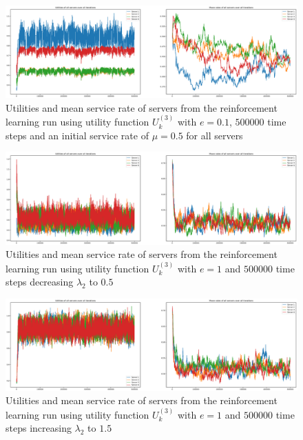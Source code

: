 \begin{figure}[H]
    \includegraphics[width=\textwidth]{chapters/00_appendix/03_more_rl_results/Bin/utility_3_eps/u3_3_initial_05.eps}
    \caption{Utilities and mean service rate of servers from the reinforcement
    learning run using utility function \(U_k^{(3)}\) with \(e = 0.1\),
    \(500000\) time steps and an initial service rate of \(\mu = 0.5\) for all
    servers}
    \label{fig:RL_utility3_3_initial_05}
\end{figure}

\begin{figure}[H]
    \includegraphics[width=\textwidth]{chapters/00_appendix/03_more_rl_results/Bin/utility_3_eps/u3_4_lambda2_05.eps}
    \caption{Utilities and mean service rate of servers from the reinforcement
    learning run using utility function \(U_k^{(3)}\) with \(e = 1\) and
    \(500000\) time steps decreasing \(\lambda_2\) to \(0.5\)}
    \label{fig:RL_utility3_4_lambda2_05}
\end{figure}

\begin{figure}[H]
    \includegraphics[width=\textwidth]{chapters/00_appendix/03_more_rl_results/Bin/utility_3_eps/u3_4_lambda2_15.eps}
    \caption{Utilities and mean service rate of servers from the reinforcement
    learning run using utility function \(U_k^{(3)}\) with \(e = 1\) and
    \(500000\) time steps increasing \(\lambda_2\) to \(1.5\)}
    \label{fig:RL_utility3_4_lambda2_15}
\end{figure}


